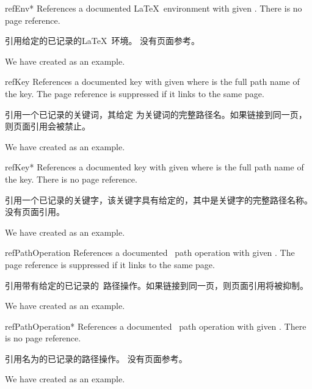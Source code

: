 \begin{docCommand}{refEnv*}{}
References a documented \LaTeX\ environment with given .
There is no page reference.

引用给定的已记录的\LaTeX\ 环境。 没有页面参考。
\begin{dispExample}
We have created  as an example.
\end{dispExample}
\end{docCommand}


\begin{docCommand}{refKey}{}
References a documented key with given  where 
is the full path name of the key.
The page reference is suppressed if it links to the same page.

引用一个已记录的关键词，其给定  为关键词的完整路径名。如果链接到同一页，则页面引用会被禁止。
\begin{dispExample}
We have created  as an example.
\end{dispExample}
\end{docCommand}

\begin{docCommand}{refKey*}{}
References a documented key with given  where 
is the full path name of the key.
There is no page reference.

引用一个已记录的关键字，该关键字具有给定的，其中是关键字的完整路径名称。 没有页面引用。
\begin{dispExample}
We have created  as an example.
\end{dispExample}
\end{docCommand}


\begin{docCommand}[doc new=2019-09-17]{refPathOperation}{}
References a documented \tikzname\ path operation with given .
The page reference is suppressed if it links to the same page.

引用带有给定的已记录的\tikzname\ 路径操作。如果链接到同一页，则页面引用将被抑制。
\begin{dispExample}
We have created  as an example.
\end{dispExample}
\end{docCommand}

\begin{docCommand}[doc new=2019-09-17]{refPathOperation*}{}
References a documented \tikzname\ path operation with given .
There is no page reference.

引用名为的已记录的\tikzname 路径操作。 没有页面参考。
\begin{dispExample}
We have created  as an example.
\end{dispExample}
\end{docCommand}



